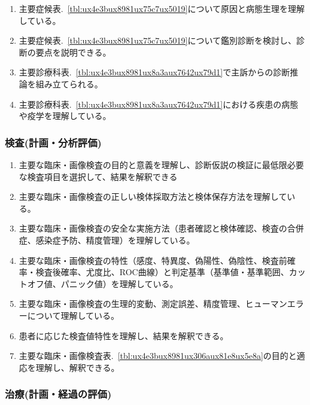 \begin{enumerate}
\def\labelenumi{\arabic{enumi}.}
\tightlist
\item
  主要症候表.~\ref{tbl:ux4e3bux8981ux75c7ux5019}について原因と病態生理を理解している。
\item
  主要症候表.~\ref{tbl:ux4e3bux8981ux75c7ux5019}について鑑別診断を検討し、診断の要点を説明できる。
\item
  主要診療科表.~\ref{tbl:ux4e3bux8981ux8a3aux7642ux79d1}で主訴からの診断推論を組み立てられる。
\item
  主要診療科表.~\ref{tbl:ux4e3bux8981ux8a3aux7642ux79d1}における疾患の病態や疫学を理解している。
\end{enumerate}

\hypertarget{ux691cux67fbux8a08ux753bux5206ux6790ux8a55ux4fa1}{%
\subsubsection{検査(計画・分析評価)}\label{ux691cux67fbux8a08ux753bux5206ux6790ux8a55ux4fa1}}

\begin{enumerate}
\def\labelenumi{\arabic{enumi}.}
\tightlist
\item
  主要な臨床・画像検査の目的と意義を理解し、診断仮説の検証に最低限必要な検査項目を選択して、結果を解釈できる
\item
  主要な臨床・画像検査の正しい検体採取方法と検体保存方法を理解している。
\item
  主要な臨床・画像検査の安全な実施方法（患者確認と検体確認、検査の合併症、感染症予防、精度管理）を理解している。
\item
  主要な臨床・画像検査の特性（感度、特異度、偽陽性、偽陰性、検査前確率・検査後確率、尤度比、ROC曲線）と判定基準（基準値・基準範囲、カットオフ値、パニック値）を理解している。
\item
  主要な臨床・画像検査の生理的変動、測定誤差、精度管理、ヒューマンエラーについて理解している。
\item
  患者に応じた検査値特性を理解し、結果を解釈できる。
\item
  主要な臨床・画像検査表.~\ref{tbl:ux4e3bux8981ux306aux81e8ux5e8a}の目的と適応を理解し、解釈できる。
\end{enumerate}

\hypertarget{ux6cbbux7642ux8a08ux753bux7d4cux904eux306eux8a55ux4fa1}{%
\subsubsection{治療(計画・経過の評価)}\label{ux6cbbux7642ux8a08ux753bux7d4cux904eux306eux8a55ux4fa1}}

